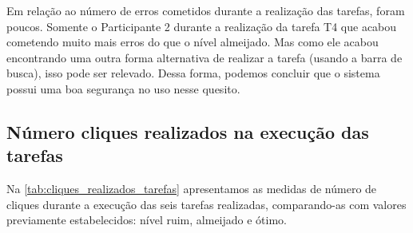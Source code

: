 Em relação ao número de erros cometidos durante a realização das tarefas, foram poucos. Somente o Participante 2 durante a realização da tarefa T4 que acabou cometendo muito mais erros do que o nível almeijado. Mas como ele acabou encontrando uma outra forma alternativa de realizar a tarefa (usando a barra de busca), isso pode ser relevado. Dessa forma, podemos concluir que o sistema possui uma boa segurança no uso nesse quesito. 

\subsection{Número cliques realizados na execução das tarefas}
Na \autoref{tab:cliques_realizados_tarefas} apresentamos as medidas de número de cliques durante a execução das seis tarefas realizadas, comparando-as com valores previamente estabelecidos: nível ruim, almeijado e ótimo. 

\begin{table}[H]
\end{table}

